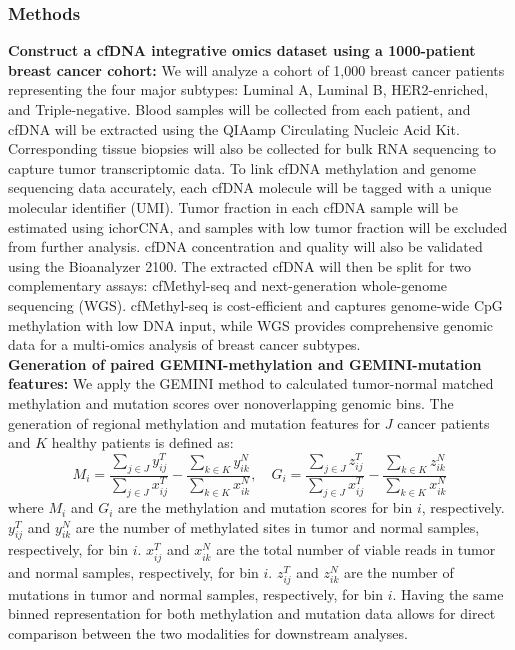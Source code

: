 \documentclass[11pt]{article}
\begin{document}
\subsubsection*{Methods}
\textbf{Construct a cfDNA integrative omics dataset using a 1000-patient breast cancer cohort:}
We will analyze a cohort of 1,000 breast cancer patients representing the four major subtypes: Luminal A, Luminal B, HER2-enriched, and Triple-negative.
Blood samples will be collected from each patient, and cfDNA will be extracted using the QIAamp Circulating Nucleic Acid Kit.
Corresponding tissue biopsies will also be collected for bulk RNA sequencing to capture tumor transcriptomic data.
To link cfDNA methylation and genome sequencing data accurately, each cfDNA molecule will be tagged with a unique molecular identifier (UMI).
Tumor fraction in each cfDNA sample will be estimated using ichorCNA, and samples with low tumor fraction will be excluded from further analysis.
cfDNA concentration and quality will also be validated using the Bioanalyzer 2100. 
The extracted cfDNA will then be split for two complementary assays: cfMethyl-seq and next-generation whole-genome sequencing (WGS). cfMethyl-seq is cost-efficient and captures genome-wide CpG methylation with low DNA input, while WGS provides comprehensive genomic data for a multi-omics analysis of breast cancer subtypes.
\medskip \\
\textbf{Generation of paired GEMINI-methylation and GEMINI-mutation features:}
We apply the GEMINI method to calculated tumor-normal matched methylation and mutation
scores over nonoverlapping genomic bins.
The generation of regional methylation and mutation features for $J$ cancer patients and $K$ healthy patients is defined as:
\begin{equation}
	M_{i} = \frac{\sum\limits_{j \in J}{y^{T}_{ij}}}{\sum\limits_{j \in J}{x^{T}_{ij}}} - 
	\frac{\sum\limits_{k \in K}{y^{N}_{ik}}}{\sum\limits_{k \in K}{x^{N}_{ik}}},
	\quad
	G_{i} = \frac{\sum\limits_{j \in J}{z^{T}_{ij}}}{\sum\limits_{j \in J}{x^{T}_{ij}}} - 
	\frac{\sum\limits_{k \in K}{z^{N}_{ik}}}{\sum\limits_{k \in K}{x^{N}_{ik}}}
\end{equation}
where $M_{i}$ and $G_{i}$ are the methylation and mutation scores for bin $i$, respectively. 
$y^{T}_{ij}$ and $y^{N}_{ik}$ are the number of methylated sites in tumor and normal samples, respectively, for bin $i$.
$x^{T}_{ij}$ and $x^{N}_{ik}$ are the total number of viable reads in tumor and normal samples, respectively, for bin $i$.
$z^{T}_{ij}$ and $z^{N}_{ik}$ are the number of mutations in tumor and normal samples, respectively, for bin $i$.
Having the same binned representation for both methylation and mutation data allows for direct comparison between the two modalities for downstream analyses.
\end{document}
